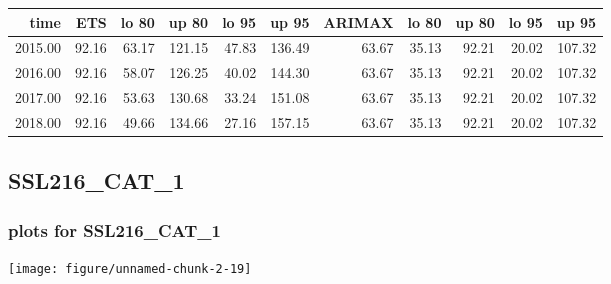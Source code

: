 \documentclass[10pt,a4paper]{article}\usepackage[]{graphicx}\usepackage[]{color}
\makeatletter
\def\maxwidth{ %
  \ifdim\Gin@nat@width>\linewidth
    \linewidth
  \else
    \Gin@nat@width
  \fi
}
\newcommand{\AaA}{\_}
\makeatother
\begin{document}
\begin{table}[ht]
\centering
\begin{tabular}{rrrrrrrrrrr}
  \hline
time & ETS  & lo 80 & up 80 & lo 95 & up 95 & ARIMAX  & lo 80 & up 80 & lo 95 & up 95 \\ 
  \hline
2015.00 & 92.16 & 63.17 & 121.15 & 47.83 & 136.49 & 63.67 & 35.13 & 92.21 & 20.02 & 107.32 \\ 
  2016.00 & 92.16 & 58.07 & 126.25 & 40.02 & 144.30 & 63.67 & 35.13 & 92.21 & 20.02 & 107.32 \\ 
  2017.00 & 92.16 & 53.63 & 130.68 & 33.24 & 151.08 & 63.67 & 35.13 & 92.21 & 20.02 & 107.32 \\ 
  2018.00 & 92.16 & 49.66 & 134.66 & 27.16 & 157.15 & 63.67 & 35.13 & 92.21 & 20.02 & 107.32 \\ 
   \hline
\end{tabular}
\end{table}

\newpage
\subsection{SSL216\AaA CAT\AaA 1}
\subsubsection{plots for SSL216\AaA CAT\AaA 1}

\texttt{[image: figure/unnamed-chunk-2-19]} 

\newpage
\end{document}
